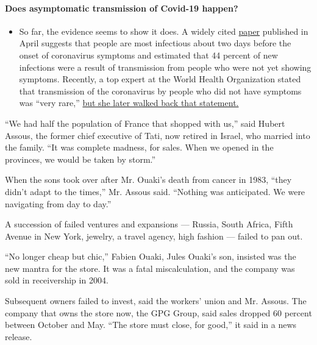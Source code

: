 \begin{itemize}
{  \paragraph{Does asymptomatic transmission of Covid-19
  happen?}\label{does-asymptomatic-transmission-of-covid-19-happen}}

  \begin{itemize}
  \tightlist
  \item
    So far, the evidence seems to show it does. A widely cited
    \href{https://www.nature.com/articles/s41591-020-0869-5}{paper}
    published in April suggests that people are most infectious about
    two days before the onset of coronavirus symptoms and estimated that
    44 percent of new infections were a result of transmission from
    people who were not yet showing symptoms. Recently, a top expert at
    the World Health Organization stated that transmission of the
    coronavirus by people who did not have symptoms was ``very rare,''
    \href{https://www.nytimes3xbfgragh.onion/2020/06/09/world/coronavirus-updates.html?action=click\&pgtype=Article\&state=default\&region=MAIN_CONTENT_3\&context=storylines_faq\#link-1f302e21}{but
    she later walked back that statement.}
  \end{itemize}
\end{itemize}

``We had half the population of France that shopped with us,'' said
Hubert Assous, the former chief executive of Tati, now retired in
Israel, who married into the family. ``It was complete madness, for
sales. When we opened in the provinces, we would be taken by storm.''

When the sons took over after Mr. Ouaki's death from cancer in 1983,
``they didn't adapt to the times,'' Mr. Assous said. ``Nothing was
anticipated. We were navigating from day to day.''

A succession of failed ventures and expansions --- Russia, South Africa,
Fifth Avenue in New York, jewelry, a travel agency, high fashion ---
failed to pan out.

``No longer cheap but chic,'' Fabien Ouaki, Jules Ouaki's son, insisted
was the new mantra for the store. It was a fatal miscalculation, and the
company was sold in receivership in 2004.

Subsequent owners failed to invest, said the workers' union and Mr.
Assous. The company that owns the store now, the GPG Group, said sales
dropped 60 percent between October and May. ``The store must close, for
good,'' it said in a news release.

